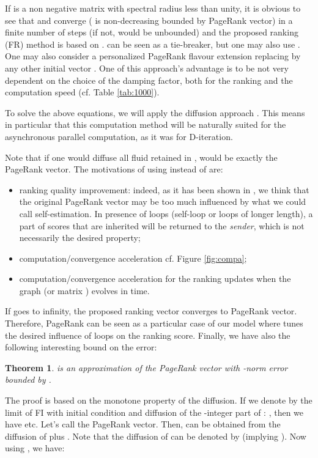 \documentclass[conference]{IEEEtran}
\newtheorem{theorem}{Theorem}
\begin{document}
\begin{psfrags}
If  is a non negative matrix with spectral radius less than unity, 
it is obvious to see that  and  converge ( is non-decreasing bounded by PageRank vector)
in a finite number of steps (if not,  would be unbounded) and the proposed ranking (FR)
method is based on .  can be seen as a tie-breaker, but one may also use .
One may also consider a personalized PageRank flavour extension replacing 
by any other initial vector .
One of this approach's advantage is to be not very dependent on the choice
of the damping factor, both for the ranking and the computation speed (cf. Table \ref{tab:1000}).

To solve the above equations, we will apply the diffusion approach \cite{d-algo}.
This means in particular that this computation method will be naturally suited for the asynchronous
parallel computation, as it was for D-iteration.

Note that if one would diffuse all fluid retained in ,  would be
exactly the PageRank vector. The motivations of using  instead of
 are:
\begin{itemize}
\item ranking quality improvement: indeed, as it has been shown in \cite{diversity}, we
  think that the original PageRank vector may be too much influenced by what we could call
  self-estimation. In presence of loops (self-loop or loops of longer length), a
  part of scores that are inherited will be returned to the {\em sender}, which is not
  necessarily the desired property;
\item computation/convergence acceleration cf. Figure \ref{fig:compa};
\item computation/convergence acceleration for the ranking updates when the graph
 (or matrix ) evolves in time.
\end{itemize}

If  goes
to infinity, the proposed ranking vector converges to PageRank vector.
Therefore, PageRank can be seen as a particular case  of our model
where  tunes the desired influence of loops on the ranking score.
Finally, we have also the following interesting bound on the error:

\begin{theorem}
 is an approximation of the PageRank vector with
-norm error bounded by .
\end{theorem}
\proof
The proof is based on the monotone property of the diffusion.
If we denote by  the limit of FI with initial condition 
and diffusion of the -integer part of : , then
we have  etc.
Let's call  the PageRank vector. 
Then,  can be obtained from the diffusion
of  plus . Note that the diffusion of  
can be denoted by  (implying ).
Now using , we have:


\end{psfrags}
\end{document}

